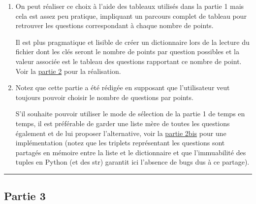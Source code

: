 \documentclass[french]{scrartcl}
\begin{document}
\begin{enumerate}
\def\labelenumi{\arabic{enumi}.}
\setcounter{enumi}{2}
\item
  On peut réaliser ce choix à l'aide des tableaux utilisés dans la
  partie 1 mais cela est assez peu pratique, impliquant un parcours
  complet de tableau pour retrouver les questions correspondant à chaque
  nombre de points.

  Il est plus pragmatique et lisible de créer un dictionnaire lors de la
  lecture du fichier dont les clés seront le nombre de points par
  question possibles et la valeur associée est le tableau des questions
  rapportant ce nombre de point. Voir la \href{partie2.py}{partie 2}
  pour la réalisation.
\item
  Notez que cette partie a été rédigée en supposant que l'utilisateur
  veut toujours pouvoir choisir le nombre de questions par points.

  S'il souhaite pouvoir utiliser le mode de sélection de la partie 1 de
  temps en temps, il est préférable de garder une liste mère de toutes
  les questions également et de lui proposer l'alternative, voir la
  \href{partie2bis.py}{partie 2bis} pour une implémentation (notez que
  les triplets représentant les questions sont partagés en mémoire entre
  la liste et le dictionnaire et que l'immuabilité des tuples en Python
  (et des str) garantit ici l'absence de bugs dus à ce partage).
\end{enumerate}

\begin{center}\rule{0.5\linewidth}{0.5pt}\end{center}

\hypertarget{partie-3}{%
\subsection{Partie 3}\label{partie-3}}
\end{document}
